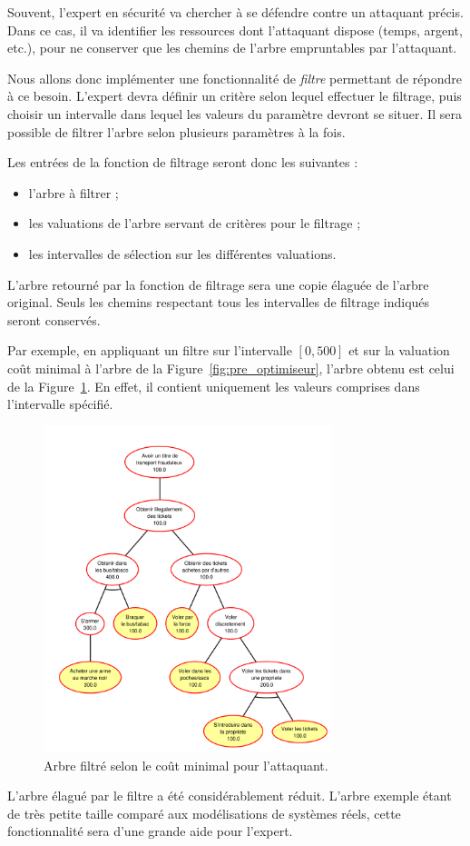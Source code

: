         Souvent, l'expert en sécurité va chercher à se défendre contre un attaquant précis. Dans ce cas, il va identifier les ressources dont l'attaquant dispose (temps, argent, etc.), pour ne conserver que les chemins de l'arbre empruntables par l'attaquant.

        Nous allons donc implémenter une fonctionnalité de \textit{filtre} permettant de répondre à ce besoin. L'expert devra définir un critère selon lequel effectuer le filtrage, puis choisir un intervalle dans lequel les valeurs du paramètre devront se situer. Il sera possible de filtrer l'arbre selon plusieurs paramètres à la fois.

        Les entrées de la fonction de filtrage seront donc les suivantes :
        \begin{itemize}
            \item l'arbre à filtrer ;
            \item les valuations de l'arbre servant de critères pour le filtrage ;
            \item les intervalles de sélection sur les différentes valuations.
        \end{itemize}
        L'arbre retourné par la fonction de filtrage sera une copie élaguée de l'arbre original. Seuls les chemins respectant tous les intervalles de filtrage indiqués seront conservés.

        Par exemple, en appliquant un filtre sur l'intervalle $[0, 500]$ et sur la valuation \og coût minimal \fg{} à l'arbre de la {\sc Figure}~\ref{fig:pre_optimiseur}, l'arbre obtenu est celui de la {\sc Figure}~\ref{fig:arbre_post_filtre}. En effet, il contient uniquement les valeurs comprises dans l'intervalle spécifié. 
        \begin{figure}[!h]
            \centering
            \includegraphics[width=0.75\textwidth]{figure/post_filtre.pdf}
            \caption{Arbre filtré selon le coût minimal pour l'attaquant.}
            \label{fig:arbre_post_filtre}
        \end{figure}
        L'arbre élagué par le filtre a été considérablement réduit. L'arbre exemple étant de très petite taille comparé aux modélisations de systèmes réels, cette fonctionnalité sera d'une grande aide pour l'expert.

